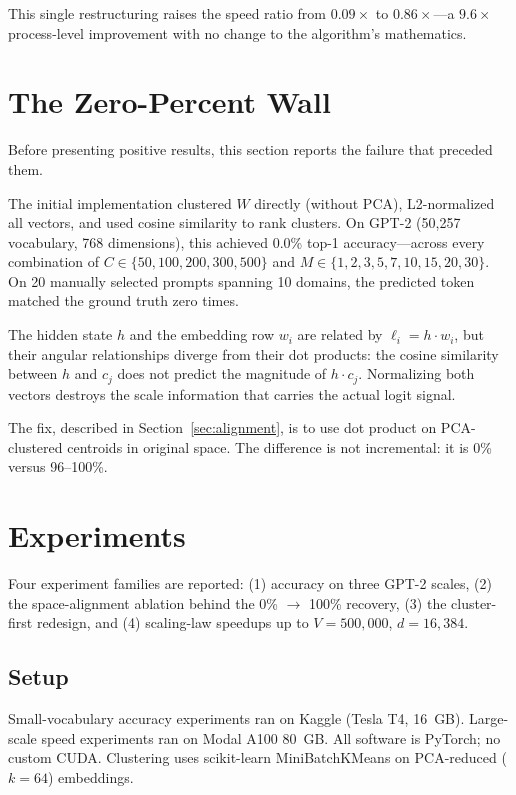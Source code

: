 \documentclass[11pt]{article}
\begin{document}
This single restructuring raises the speed ratio from $0.09\times$ to $0.86\times$---a $9.6\times$ process-level improvement with no change to the algorithm's mathematics.

\section{The Zero-Percent Wall}\label{sec:zero_wall}

Before presenting positive results, this section reports the failure that preceded them.

The initial implementation clustered $W$ directly (without PCA), L2-normalized all vectors, and used cosine similarity to rank clusters. On GPT-2 (50{,}257 vocabulary, 768 dimensions), this achieved 0.0\% top-1 accuracy---across every combination of $C \in \{50, 100, 200, 300, 500\}$ and $M \in \{1, 2, 3, 5, 7, 10, 15, 20, 30\}$. On 20 manually selected prompts spanning 10 domains, the predicted token matched the ground truth zero times.

The hidden state $h$ and the embedding row $w_i$ are related by $\ell_i = h \cdot w_i$, but their angular relationships diverge from their dot products: the cosine similarity between $h$ and $c_j$ does not predict the magnitude of $h \cdot c_j$. Normalizing both vectors destroys the scale information that carries the actual logit signal.

The fix, described in Section~\ref{sec:alignment}, is to use dot product on PCA-clustered centroids in original space. The difference is not incremental: it is 0\% versus 96--100\%.

\section{Experiments}

Four experiment families are reported: (1) accuracy on three GPT-2 scales, (2) the space-alignment ablation behind the 0\% $\rightarrow$ 100\% recovery, (3) the cluster-first redesign, and (4) scaling-law speedups up to $V = 500{,}000$, $d = 16{,}384$.

\subsection{Setup}

Small-vocabulary accuracy experiments ran on Kaggle (Tesla T4, 16~GB). Large-scale speed experiments ran on Modal A100 80~GB. All software is PyTorch; no custom CUDA. Clustering uses scikit-learn MiniBatchKMeans on PCA-reduced ($k = 64$) embeddings.
\end{document}

